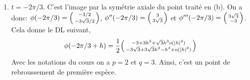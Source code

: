 \documentclass{tp_um}
\begin{document}
\begin{enumerate}
{\begin{enumerate}
                        \item $t= -2\pi/3$. C'est l'image par la symétrie axiale du point traité en (b). On a donc:	$\phi(-2\pi/3) = \begin{psmallmatrix} -3/2 \\ -3\sqrt 3/2
                            \end{psmallmatrix}$, $\phi''(-2\pi/3) = \begin{psmallmatrix}
                                3\\3\sqrt{3}
                            \end{psmallmatrix} $ et  $\phi'''(-2\pi/3) = \begin{psmallmatrix}
                                3\sqrt{3}\\-3
                            \end{psmallmatrix}$. 
                            Cela donne le DL suivant,
                            \[
                                \phi(-2\pi/3+ h ) =  \frac 1 2 \begin{psmallmatrix}
                                    - 3  + 3h^2 + \sqrt{3}h^3 o(\left\lvert h\right\rvert^3)	\\  -3\sqrt 3  +3 \sqrt 3 h^2  - h^3 + o(\left\lvert h\right\rvert^3)
                                \end{psmallmatrix}
                            \]
                            Avec les notations du cours on a $p=2$ et $q=3$. Ainsi, c'est un point de rebroussement de première espèce. 
                            \begin{center}
                                \end{center}
                    \end{enumerate}
                }






\end{enumerate}
\end{document}
